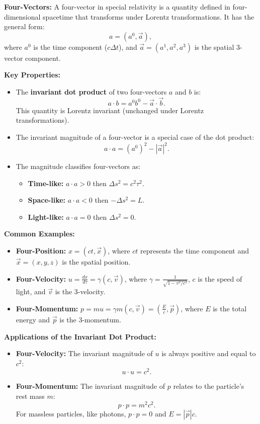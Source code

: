 \documentclass{article}
\newcommand{\conceptbox}[1]{\begin{tcolorbox}[colback=blue!10] #1 \end{tcolorbox}}
\begin{document}
\conceptbox{
\textbf{Four-Vectors:} A four-vector in special relativity is a quantity defined in four-dimensional spacetime that transforms under Lorentz transformations. It has the general form:
\[
a = (a^0, \vec{a}),
\]
where \( a^0 \) is the time component ($c\Delta t$), and \( \vec{a} = (a^1, a^2, a^3) \) is the spatial 3-vector component.


\textbf{Key Properties:}
\begin{itemize}
    \item The \textbf{invariant dot product} of two four-vectors \( a \) and \( b \) is:
    \[
    a \cdot b = a^0 b^0 - \vec{a} \cdot \vec{b}.
    \]
    This quantity is Lorentz invariant (unchanged under Lorentz transformations).
    \item The invariant magnitude of a four-vector is a special case of the dot product:
    \[
    a \cdot a = (a^0)^2 - |\vec{a}|^2.
    \]
    \item The magnitude classifies four-vectors as:
    \begin{itemize}
        \item \textbf{Time-like:} \( a \cdot a > 0 \) then $ \Delta s^2 = c^2\tau^2$.
        \item \textbf{Space-like:} \( a \cdot a < 0 \) then $ -\Delta s^2 = L $.
        \item \textbf{Light-like:} \( a \cdot a = 0 \) then $ \Delta s^2 = 0 $.
    \end{itemize}
\end{itemize}

\textbf{Common Examples:}
\begin{itemize}
    \item \textbf{Four-Position:} \( x = (ct, \vec{x}) \), where \( ct \) represents the time component and \( \vec{x} = (x, y, z) \) is the spatial position.
    \item \textbf{Four-Velocity:} \( u = \displaystyle\frac{dx}{d\tau} = \gamma (c, \vec{v}) \), where \( \gamma = \frac{1}{\sqrt{1 - v^2/c^2}} \), \( c \) is the speed of light, and \( \vec{v} \) is the 3-velocity.
    \item \textbf{Four-Momentum:} \( p = mu = \gamma m (c, \vec{v}) = \left( \frac{E}{c}, \vec{p} \right) \), where \( E \) is the total energy and \( \vec{p} \) is the 3-momentum.
\end{itemize}

\textbf{Applications of the Invariant Dot Product:}
\begin{itemize}
    \item \textbf{Four-Velocity:} The invariant magnitude of \( u \) is always positive and equal to \( c^2 \):
    \[
    u \cdot u = c^2.
    \]
    \item \textbf{Four-Momentum:} The invariant magnitude of \( p \) relates to the particle's rest mass \( m \):
    \[
    p \cdot p = m^2 c^2.
    \]
    For massless particles, like photons, \( p \cdot p = 0 \) and \( E = |\vec{p}|c \).
\end{itemize}
}
\end{document}
